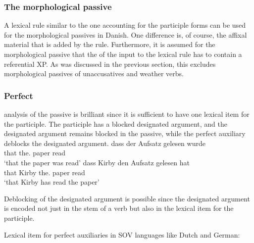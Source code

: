 \subsubsection{The morphological passive}

A lexical rule similar to the one accounting for the participle forms can be used for the
morphological passives in Danish. One difference is, of course, the affixal material that is added by
the rule. Furthermore, it is assumed for the morphological passive that the \da of the input to the lexical rule has to contain
a referential XP. As was discussed in the previous section, this excludes morphological passives of
unaccusatives and weather verbs. 





\subsubsection{Perfect}

 analysis of the passive is brilliant since it is sufficient to have one lexical
item for the participle. The participle has a blocked designated argument, and the designated
argument remains blocked in the passive, while the perfect auxiliary deblocks the designated 
argument. 
\eal
\ex
\gll dass der        Aufsatz gelesen wurde\\
     that the.\NOM{} paper   read    \AUX\\
\glt `that the paper was read'
\ex
\gll dass Kirby den Aufsatz gelesen hat\\
     that Kirby the.\ACC{} paper read \AUX\\
\glt `that Kirby has read the paper'
\zl

\largerpage
\noindent
Deblocking of the designated argument is possible since the designated argument is encoded not just in the stem of a verb
but also in the lexical item for the participle.   

\ea
Lexical item for perfect auxiliaries in SOV languages like Dutch and German:\\
\z



